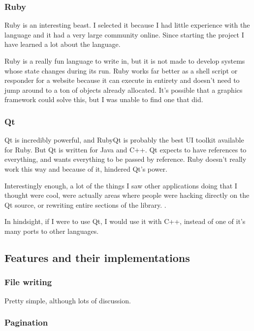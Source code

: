 \documentclass[10pt]{article}
\begin{document}
\subsubsection{Ruby}

Ruby is an interesting beast. I selected it because I had little experience with the language and it had a very large community online. Since starting the project I have learned a lot about the language.

Ruby is a really fun language to write in, but it is not made to develop systems whose state changes during its run. Ruby works far better as a shell script or responder for a website because it can execute in entirety and doesn't need to jump around to a ton of objects already allocated. It's possible that a graphics framework could solve this, but I was unable to find one that did.

\subsubsection{Qt}

Qt is incredibly powerful, and RubyQt \cite{rubyqt} is probably the best UI toolkit available for Ruby. But Qt is written for Java and C++. Qt expects to have references to everything, and wants everything to be passed by reference. Ruby doesn't really work this way and because of it, hindered Qt's power.

Interestingly enough, a lot of the things I saw other applications doing that I thought were cool, were actually areas where people were hacking directly on the Qt source, or rewriting entire sections of the library. \cite{kwrite}.

In hindsight, if I were to use Qt, I would use it with C++, instead of one of it's many ports to other languages.

\subsection{Features and their implementations}

\subsubsection{File writing}

Pretty simple, although lots of discussion.

\subsubsection{Pagination}
\end{document}
